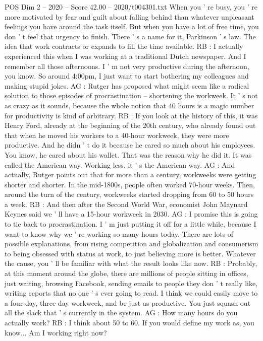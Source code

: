 \begin{textsample}{POS Dim 2 – 2020 – Score 42.00 – 2020/t004301.txt}
When you ' re busy, you ' re more motivated by fear and guilt about falling behind than whatever unpleasant feelings you have around the task itself.
But when you have a lot of free time, you don ' t feel that urgency to finish.
There ' s a name for it, Parkinson ' s law.
The idea that work contracts or expands to fill the time available.
RB : I actually experienced this when I was working at a traditional Dutch newspaper.
And I remember all those afternoons.
I ' m not very productive during the afternoon, you know.
So around 4:00pm, I just want to start bothering my colleagues and making stupid jokes.
AG : Rutger has proposed what might seem like a radical solution to those episodes of procrastination -- shortening the workweek.
It ' s not as crazy as it sounds, because the whole notion that 40 hours is a magic number for productivity is kind of arbitrary.
RB : If you look at the history of this, it was Henry Ford, already at the beginning of the 20th century, who already found out that when he moved his workers to a 40-hour workweek, they were more productive.
And he didn ' t do it because he cared so much about his employees.
You know, he cared about his wallet.
That was the reason why he did it.
It was called the American way.
Working less, it ' s the American way.
AG : And actually, Rutger points out that for more than a century, workweeks were getting shorter and shorter.
In the mid-1800s, people often worked 70-hour weeks.
Then, around the turn of the century, workweeks started dropping from 60 to 50 hours a week.
RB : And then after the Second World War, economist John Maynard Keynes said we ' ll have a 15-hour workweek in 2030.
AG : I promise this is going to tie back to procrastination.
I ' m just putting it off for a little while, because I want to know why we ' re working so many hours today.
There are lots of possible explanations, from rising competition and globalization and consumerism to being obsessed with status at work, to just believing more is better.
Whatever the cause, you ' ll be familiar with what the result looks like now.
RB : Probably, at this moment around the globe, there are millions of people sitting in offices, just waiting, browsing Facebook, sending emails to people they don ' t really like, writing reports that no one ' s ever going to read.
I think we could easily move to a four-day, three-day workweek, and be just as productive.
You just squash out all the slack that ' s currently in the system.
AG : How many hours do you actually work?
RB : I think about 50 to 60.
If you would define my work as, you know...
Am I working right now?

\end{textsample}
